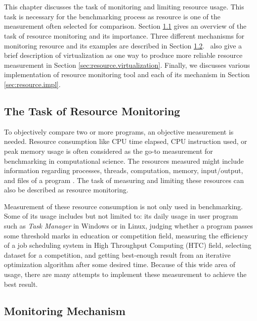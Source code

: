\chapter{\chResource}
\label{ch:resource}

This chapter discusses the task of monitoring and limiting resource usage.
This task is necessary for the benchmarking process as resource is one of the measurement often selected for comparison.
Section \ref{sec:resource.overview} gives an overview of the task of resource monitoring and its importance.
Three different mechanisms for monitoring resource and its examples are described in Section \ref{sec:resource.mechanism}.
\First~also give a brief description of virtualization as one way to produce more reliable resource measurement in Section \ref{sec:resource.virtualization}.
Finally, we discusses various implementation of resource monitoring tool and each of its mechanism in Section \ref{sec:resource.impl}.

\section{The Task of Resource Monitoring}
\label{sec:resource.overview}

To objectively compare two or more programs, an objective measurement is needed.
Resource consumption like CPU time elapsed, CPU instruction used, or peak memory usage is often considered as the go-to measurement for benchmarking in computational science.
The resources measured might include information regarding processes, threads, computation, memory, input/output, and files of a program \citep{juvePracticalResourceMonitoring2015}.
The task of measuring and limiting these resources can also be described as resource monitoring.

Measurement of these resource consumption is not only used in benchmarking.
Some of its usage includes but not limited to:
its daily usage in user program such as \textit{Task Manager} in Windows or  in Linux,
judging whether a program passes some threshold marks in education or competition field,
measuring the efficiency of a job scheduling system in High Throughput Computing (HTC) field,
selecting dataset for a competition,
and getting best-enough result from an iterative optimization algorithm after some desired time.
Because of this wide area of usage, there are many attempts to implement these measurement to achieve the best result.

\section{Monitoring Mechanism}
\label{sec:resource.mechanism}

